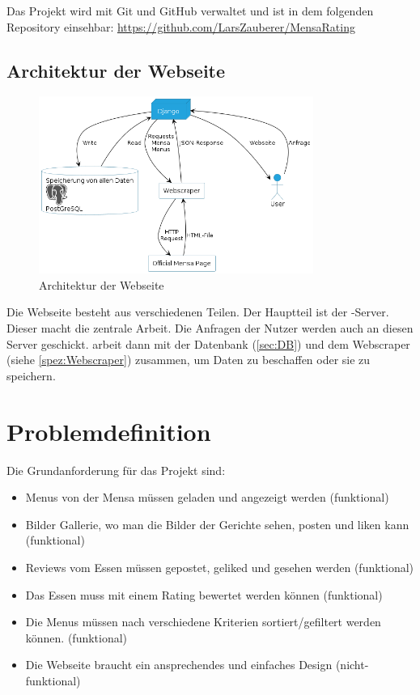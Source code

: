 Das Projekt wird mit Git und GitHub verwaltet und ist in dem folgenden
Repository einsehbar: \url{https://github.com/LarsZauberer/MensaRating}

\newpage

\subsection{Architektur der Webseite}
\begin{figure}[ht]
    \centering
    \includegraphics[width=0.8\textwidth]{images/Webseite.png}
    \caption{Architektur der Webseite}
    \label{fig:Website}
\end{figure}

Die Webseite besteht aus verschiedenen Teilen. Der Hauptteil ist der
-Server. Dieser macht die zentrale Arbeit. Die Anfragen der Nutzer
werden auch an diesen Server geschickt.  arbeit dann mit der
Datenbank (\ref{sec:DB}) und dem Webscraper (siehe \ref{spez:Webscraper})
zusammen, um Daten zu beschaffen oder sie zu speichern.

\newpage

\section{Problemdefinition}\label{sec:problemdefinition}

Die Grundanforderung für das Projekt sind:
\begin{itemize}
    \item Menus von der Mensa müssen geladen und angezeigt werden (funktional)
    \item Bilder Gallerie, wo man die Bilder der Gerichte sehen, posten und liken kann (funktional)
    \item Reviews vom Essen müssen gepostet, geliked und gesehen werden (funktional)
    \item Das Essen muss mit einem Rating bewertet werden können (funktional)
    \item Die Menus müssen nach verschiedene Kriterien sortiert/gefiltert werden können. (funktional)
    \item Die Webseite braucht ein ansprechendes und einfaches Design (nicht-funktional)
\end{itemize}

